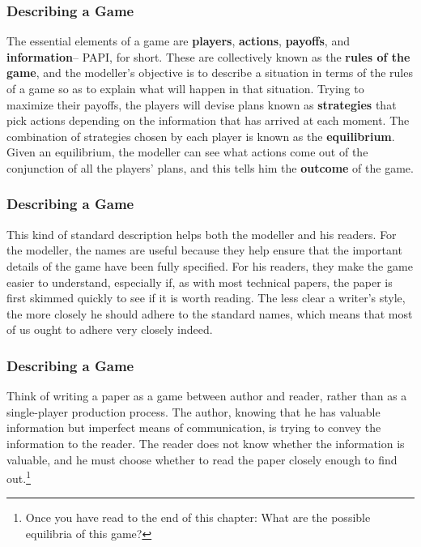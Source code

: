  \begin{frame}[fragile]\frametitle{Describing a Game}
The essential elements of a game are {\bf players}, {\bf actions},
{\bf payoffs}, and {\bf information}-- PAPI, for short.   These are collectively
known as the {\bf rules of the game}, and the modeller's objective is to
describe a situation  in terms of the rules of a game so as to explain what
will happen in that situation.  Trying to maximize their payoffs, the players
will devise plans known as {\bf strategies} that pick actions depending on the
information that has arrived at each moment. The combination of strategies
chosen by each player is known as the {\bf equilibrium}. Given an equilibrium,
the modeller can see what actions come out of the conjunction of all the
players'  plans, and this tells him the {\bf outcome} of the game.

\end{frame}

 \begin{frame}[fragile]\frametitle{Describing a Game}
  This kind of  standard  description helps both the modeller and his readers.
For the modeller, the names are useful because they help ensure that the
important details of the game have been fully specified. For his readers, they
make the game easier to understand, especially if, as with most technical
papers, the paper is first skimmed quickly to see if it is worth reading. The
less clear a writer's style, the more closely he should adhere to the standard
names, which means that most of us ought to adhere very closely indeed.
\end{frame}


 \begin{frame}[fragile]\frametitle{Describing a Game}
  Think of writing a paper as a game between author and reader, rather than as a
single-player production process.  The author, knowing that he has valuable
information but imperfect means of communication, is trying to convey the
information to the reader. The reader does not know whether the information is
valuable, and he must choose whether to read the paper closely enough to find
out.\footnote{Once you have read to the end of this chapter:  What are the
possible equilibria of this game?}
\end{frame}



